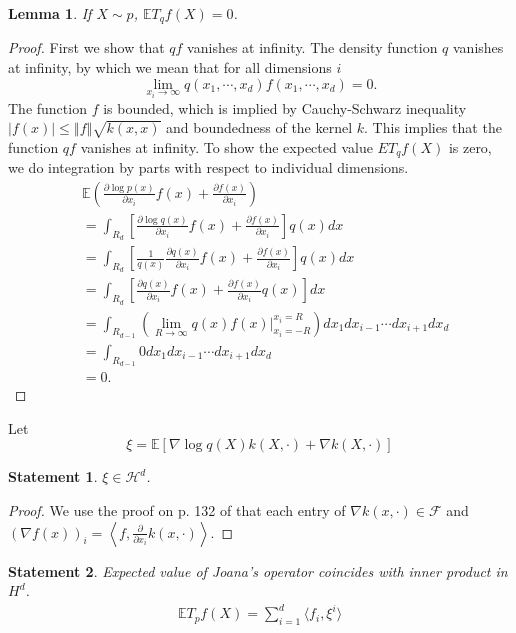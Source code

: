 \documentclass{article}
\newtheorem{lemma}{Lemma}
\newtheorem{statement}{Statement}
\begin{document}
\begin{lemma}
If $X \sim p$, $ \mathbb{E} T_{q}f(X) =0$.
\end{lemma}
\begin{proof}
First we show that $qf$ vanishes at infinity. The density function $q$ vanishes at infinity, by which we mean that for all dimensions $i$
\[
 \lim_{x_i \to \infty} q(x_1,\cdots,x_d)f(x_1,\cdots,x_d)=0.
\]
The function $f$ is bounded, which is implied by  Cauchy-Schwarz inequality  $\left|f(x)\right|\le\left\Vert f\right\Vert \sqrt{k(x,x)}$ and boundedness of the kernel $k$. This implies that the function $qf$ vanishes at infinity. To show the expected value $E T_{q}f(X)$ is zero,  we do integration by parts with respect to individual dimensions.
\begin{align*}
&\mathbb{E}\left( \frac{\partial \log p(x)}{ \partial x_i} f(x)+\frac{\partial f(x)}{ \partial x_i} \right) \\
& =\int_{R_d}   \left[ \frac{\partial \log q(x)}{ \partial x_i} f(x)+\frac{\partial f(x)}{ \partial x_i} \right]q(x)dx\\
 & =\int_{R_d} \left[\frac{1}{q(x)}\frac{\partial q(x)}{ \partial x_i}f(x)  +\frac{\partial f(x)}{ \partial x_i} \right]q(x)dx\\
 & =\int_{R_d} \left[\frac{\partial q(x)}{ \partial x_i} f(x)+\frac{\partial  f(x)}{ \partial x_i}q(x)\right]dx\\
 & = \int_{R_{d-1}} \left( \lim_{R \to \infty} q(x)f(x) \bigg|_{x_i=-R}^{x_i=R} \right) dx_1 dx_{i-1} \cdots dx_{i+1} d{x_d} \\
 & = \int_{R_{d-1}} 0 dx_1 dx_{i-1} \cdots dx_{i+1} d{x_d} \\
 & =0.
\end{align*}
\end{proof}
Let 
\[
 \xi =\mathbb{E} \left[ \nabla \log q(X) k(X,\cdot)+\nabla k(X,\cdot)\right]
\]
\begin{statement}
 $\xi \in \mathcal{H}^d$.
\end{statement}

\begin{proof}
We use the proof on p. 132 of \cite[Corollary 4.36]{SteChr08}
that each entry of $\nabla k(x,\cdot)\in\mathcal{F}$ and $\left(\nabla f(x)\right)_{i}=\left\langle f,\frac{\partial}{\partial x_{i}}k(x,\cdot)\right\rangle $.
\end{proof}


\begin{statement}
Expected value of Joana's operator coincides with inner product in $H^d$.
\begin{align}
\mathbb{E} T_{p} f(X) = \sum_{i=1}^d \langle f_i, \xi^i \rangle
\end{align}
\end{statement}
\end{document}
